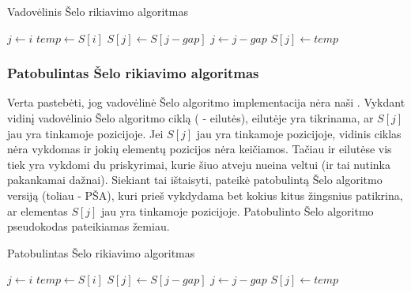 \documentclass{VUMIFInfKursinis}
\begin{document}
\begin{algorithm}[H]
  \caption{Vadovėlinis Šelo rikiavimo algoritmas}\label{alg:tss}
  \begin{algorithmic}[1]
      \State $j\gets i$
      \State $temp\gets S[i]$\label{alg:tss:assign1}
      \label{alg:tss:while:start}
        \State $S[j]\gets S[j - gap]$
        \State $j\gets j-gap$
      \EndWhile\label{alg:tss:while:end}
      \State $S[j]\gets temp$\label{alg:tss:assign2}
    \EndFor
  \EndFor
  \end{algorithmic}
\end{algorithm}

\pagebreak[4]

\subsubsection{Patobulintas Šelo rikiavimo algoritmas}

Verta pastebėti, jog vadovėlinė Šelo algoritmo implementacija nėra naši \cite{Radavičius_Baranauskas_2013}.
Vykdant vidinį vadovėlinio Šelo algoritmo ciklą ( -  eilutės),
 eilutėje yra tikrinama, ar $S[j]$ jau yra tinkamoje pozicijoje.
Jei $S[j]$ jau yra tinkamoje pozicijoje, vidinis ciklas nėra vykdomas ir jokių elementų pozicijos nėra keičiamos.
Tačiau  ir  eilutėse vis tiek yra vykdomi du priskyrimai,
kurie šiuo atveju nueina veltui (ir tai nutinka pakankamai dažnai).
Siekiant tai ištaisyti, \cite{Radavičius_Baranauskas_2013} pateikė patobulintą Šelo algoritmo versiją (toliau - PŠA), kuri prieš vykdydama
bet kokius kitus žingsnius patikrina, ar elementas $S[j]$ jau yra tinkamoje pozicijoje.
Patobulinto Šelo algoritmo pseudokodas pateikiamas žemiau.

\begin{algorithm}[H]
  \caption{Patobulintas Šelo rikiavimo algoritmas}\label{alg:iss}
  \begin{algorithmic}[1]
        \State $j\gets i$
        \State $temp\gets S[i]$
        \Repeat
          \State $S[j]\gets S[j - gap]$
          \State $j\gets j-gap$
        \State $S[j]\gets temp$
      \EndIf
    \EndFor
  \EndFor
  \end{algorithmic}
\end{algorithm}
\end{document}
